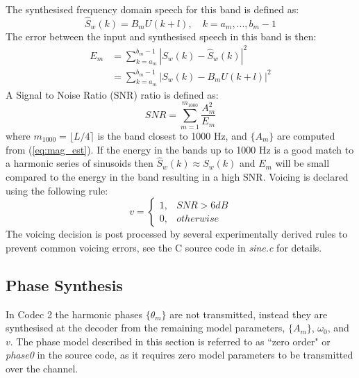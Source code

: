 \documentclass{article}
\begin{document}
{The synthesised frequency domain speech for this band is defined as:
\begin{equation}
\hat{S}_w(k) = B_m U(k + l), \quad k=a_m,...,b_m-1
\end{equation}
The error between the input and synthesised speech in this band is then:
\begin{equation}
\begin{split}
E_m &= \sum_{k=a_m}^{b_m-1} |S_w(k) - \hat{S}_w(k)|^2 \\
    &=\sum_{k=a_m}^{b_m-1} |S_w(k) - B_m U(k + l)|^2
\end{split}
\end{equation}
A Signal to Noise Ratio (SNR) ratio is defined as:
\begin{equation}
\label{eq:voicing_snr}
SNR = \sum_{m=1}^{m_{1000}} \frac{A^2_m}{E_m}
\end{equation}
where $m_{1000}= \lfloor L/4 \rceil$ is the band closest to 1000 Hz, and $\{A_m\}$ are computed from (\ref{eq:mag_est}). If the energy in the bands up to 1000 Hz is a good match to a harmonic series of sinusoids then $\hat{S}_w(k) \approx S_w(k)$ and $E_m$ will be small compared to the energy in the band resulting in a high SNR.  Voicing is declared using the following rule:
\begin{equation}
v = \begin{cases}
    1, & SNR > 6 \si{dB} \\
    0, & otherwise
    \end{cases}
\end{equation}
The voicing decision is post processed by several experimentally derived rules to prevent common voicing errors, see the C source code in \emph{sine.c} for details.

\subsection{Phase Synthesis}

In Codec 2 the harmonic phases $\{\theta_m\}$ are not transmitted, instead they are synthesised at the decoder from the remaining model parameters, $\{A_m\}$, $\omega_0$, and $v$.  The phase model described in this section is referred to as ``zero order" or \emph{phase0} in the source code, as it requires zero model parameters to be transmitted over the channel.

}
\end{document}
